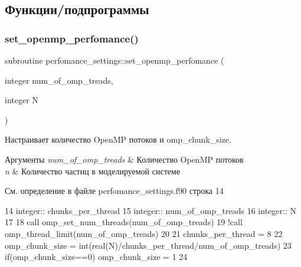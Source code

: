 \subsection{Функции/подпрограммы}
\mbox{\label{namespaceperfomance__settings_a50a101c3721ccc0da3b5867807ea6c70}} 
\subsubsection{\texorpdfstring{set\+\_\+openmp\+\_\+perfomance()}{set\_openmp\_perfomance()}}
{\footnotesize\ttfamily subroutine perfomance\+\_\+settings\+::set\+\_\+openmp\+\_\+perfomance (\begin{DoxyParamCaption}\item[{integer}]{num\+\_\+of\+\_\+omp\+\_\+treads,  }\item[{integer}]{N }\end{DoxyParamCaption})}



Настраивает количество Open\+MP потоков и omp\+\_\+chunk\+\_\+size. 


\begin{DoxyParams}{Аргументы}
{\em num\+\_\+of\+\_\+omp\+\_\+treads} & Количество Open\+MP потоков\\
\hline
{\em n} & Количество частиц в моделируемой системе \\
\hline
\end{DoxyParams}


См. определение в файле perfomance\+\_\+settings.\+f90 строка 14


\begin{DoxyCode}
14     \textcolor{keywordtype}{integer}:: chunks\_per\_thread
15     \textcolor{keywordtype}{integer}:: num\_of\_omp\_treads
16     \textcolor{keywordtype}{integer}:: N
17     
18     \textcolor{keyword}{call }omp\_set\_num\_threads(num\_of\_omp\_treads)
19     \textcolor{comment}{!call omp\_thread\_limit(num\_of\_omp\_treads)}
20     
21     chunks\_per\_thread = 8
22     omp\_chunk\_size = int(\textcolor{keywordtype}{real}(N)/chunks\_per\_thread/num\_of\_omp\_treads)
23     \textcolor{keywordflow}{if}(omp\_chunk\_size==0) omp\_chunk\_size = 1
24     
\end{DoxyCode}


